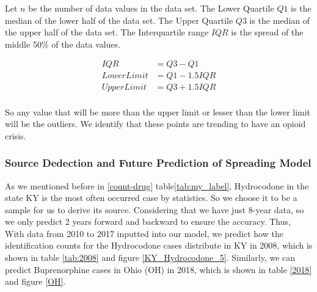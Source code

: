 \documentclass{mcmthesis}
\begin{document}
Let $n$ be the number of data values in the data set. The Lower Quartile $Q1$ is the median of the lower half of the data set. The Upper Quartile $Q3$ is the median of the upper half of the data set. The Interquartile range $IQR$ is the spread of the middle 50\% of the data values.

\begin{equation}
\begin{aligned}
    IQR &= Q3-Q1 \\
    Lower Limit &= Q1-1.5IQR \\
    Upper Limit &= Q3+1.5IQR \\
\end{aligned}
\end{equation}

So any value that will be more than the upper limit or lesser than the lower limit will be the outliers. We identify that these points are trending to have an opioid crisis.

\subsubsection{Source Dedection and Future Prediction of Spreading Model}
\label{sec: Implementation}

As we mentioned before in \ref{count-drug} table\ref{tab:my_label}, Hydrocodone in the state KY is the most often occurred case by statistics. So we choose it to be a sample for us to derive its source. Considering that we have just 8-year data, so we only predict 2 years forward and backward to ensure the accuracy. Thus, With data from 2010 to 2017 inputted into our model, we predict how the identification counts for the Hydrocodone cases distribute in KY in 2008, which is shown in table \ref{tab:2008} and figure \ref{KY_Hydrocodone_5}. Similarly, we can predict Buprenorphine cases in Ohio (OH) in 2018, which is shown in table \ref{2018} and figure \ref{OH}.
\end{document}
